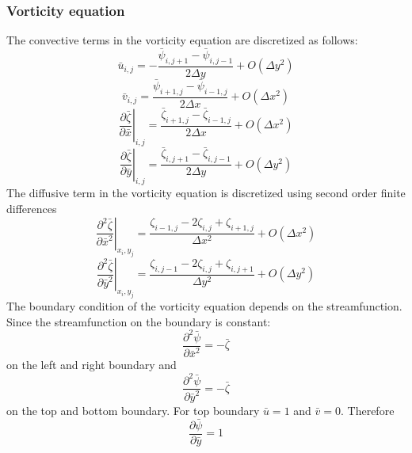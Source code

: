 \subsubsection{Vorticity equation}
%
The convective terms in the vorticity equation are discretized as follows:
\begin{equation}
\bar{u}_{i,j} = - \frac{\bar{\psi}_{i,j+1} - \bar{\psi}_{i,j-1}}{2 \Delta y} + O(\Delta y^2)
\end{equation}
\begin{equation}
\bar{v}_{i,j} = \frac{\bar{\psi}_{i+1,j} - \bar{\psi}_{i-1,j}}{2 \Delta x} + O(\Delta x^2)
\end{equation}
\begin{equation}
\left. \frac{\partial \bar{\zeta}}{\partial \bar{x}} \right|_{i,j} = \frac{\bar{\zeta}_{i+1,j}- \bar{\zeta}_{i-1,j}}{2 \Delta x} + O(\Delta x^2)
\end{equation}
\begin{equation}
\left. \frac{\partial \bar{\zeta}}{\partial \bar{y}} \right|_{i,j} = \frac{\bar{\zeta}_{i,j+1}- \bar{\zeta}_{i,j-1}}{2 \Delta y} + O(\Delta y^2)
\end{equation}
The diffusive term in the vorticity equation is discretized using second order finite differences\begin{equation}
\left. \frac{\partial^2 \bar{\zeta}}{\partial \bar{x}^2}\right|_{x_i,y_j} = \frac{\zeta_{i-1,j} - 2 \zeta_{i,j} + \zeta_{i+1,j}}{\Delta x^2} + O(\Delta x^2)
\end{equation}
\begin{equation}
\left. \frac{\partial^2 \bar{\zeta}}{\partial \bar{y}^2}\right|_{x_i,y_j} = \frac{\zeta_{i,j-1} - 2 \zeta_{i,j} + \zeta_{i,j+1}}{\Delta y^2} + O(\Delta y^2)
\end{equation}
The boundary condition of the vorticity equation depends on the streamfunction. Since the streamfunction on the boundary is constant:
\begin{equation}
\frac{\partial^2 \bar{\psi}}{\partial \bar{x}^2} = - \bar{\zeta}
\end{equation}
on the left and right boundary and
\begin{equation}
\frac{\partial^2 \bar{\psi}}{\partial \bar{y}^2} = - \bar{\zeta}
\label{eq:vort_bc}
\end{equation}
on the top and bottom boundary. For top boundary $\bar{u} = 1$ and $\bar{v} = 0$. Therefore 
\begin{equation}
\frac{\partial \bar{\psi}}{\partial \bar{y}} = 1 
\end{equation}
